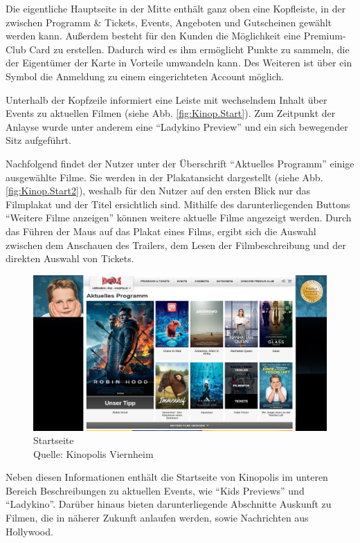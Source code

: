 	Die eigentliche Hauptseite in der Mitte enthält ganz oben eine Kopfleiste, in der zwischen Programm \& Tickets, Events, Angeboten und Gutscheinen gewählt werden kann. Außerdem besteht für den Kunden die Möglichkeit eine Premium-Club Card zu erstellen. Dadurch wird es ihm ermöglicht Punkte zu sammeln, die der Eigentümer der Karte in Vorteile umwandeln kann. Des Weiteren ist über ein Symbol die Anmeldung zu einem eingerichteten Account möglich. 
	
	Unterhalb der Kopfzeile informiert eine Leiste mit wechselndem Inhalt über Events zu aktuellen Filmen (siehe Abb. \vref{fig:Kinop.Start}). Zum Zeitpunkt der Anlayse wurde unter anderem eine \enquote{Ladykino Preview} und ein sich bewegender Sitz aufgeführt. 
	
	Nachfolgend findet der Nutzer unter der Überschrift \enquote{Aktuelles Programm} einige ausgewählte Filme. Sie werden in der Plakatansicht dargestellt (siehe Abb. \vref{fig:Kinop.Start2}), weshalb für den Nutzer auf den ersten Blick nur das Filmplakat und der Titel ersichtlich sind. Mithilfe des darunterliegenden Buttons \enquote{Weitere Filme anzeigen} können weitere aktuelle Filme angezeigt werden. Durch das Führen der Maus auf das Plakat eines Films, ergibt sich die Auswahl zwischen dem Anschauen des Trailers, dem Lesen der Filmbeschreibung und der direkten Auswahl von Tickets.
	\begin{figure}
		\centering 
		\includegraphics[width=14cm]{img/Kinopolis_MA_Start2.png}
		\captionsetup{format=hang}
		\centering\caption[Startseite 2]{\label{fig:Kinop.Start2}Startseite \\Quelle: Kinopolis Viernheim}
	\end{figure}
	
	Neben diesen Informationen enthält die Startseite von Kinopolis im unteren Bereich Beschreibungen zu aktuellen Events, wie \enquote{Kids Previews} und \enquote{Ladykino}. Darüber hinaus bieten darunterliegende Abschnitte Auskunft zu Filmen, die in näherer Zukunft anlaufen werden, sowie Nachrichten aus Hollywood. 
	
